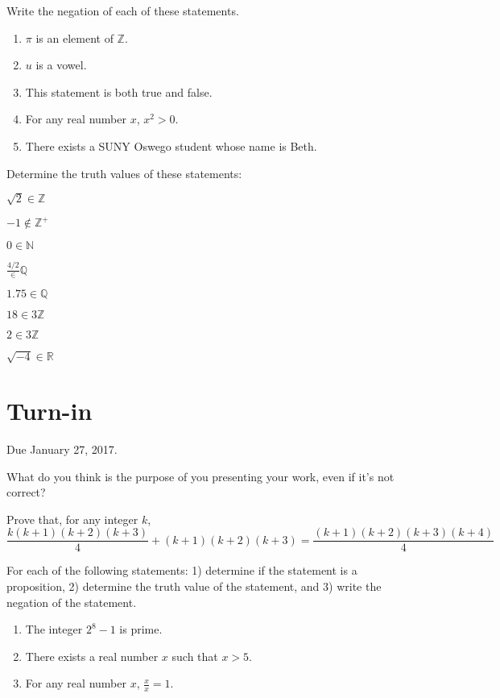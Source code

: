 \documentclass[12pt]{article}
\begin{document}
\begin{qu} Write the negation of each of these statements.
\begin{enumerate}[label=\alph*)]
\item $\pi$ is an element of $\mathbb{Z}$.
\item $u$ is a vowel.
\item This statement is both true and false.
\item For any real number $x$, $x^2>0$.
\item There exists a SUNY Oswego student whose name is Beth.
\end{enumerate}
\end{qu}

\begin{qu} Determine the truth values of these statements:

\begin{inparaenum}[a)]
\item $\sqrt{2} \in \mathbb{Z}$
\tab\item  $-1 \notin \mathbb{Z}^+$
\tab\item $0 \in \mathbb{N}$
\tab\item  $\frac{4/2} \in \mathbb{Q}$
\tab\item $1.75 \in \mathbb{Q}$
\tab\item  $18 \in 3\mathbb{Z}$
\tab \item $2 \in 3\mathbb{Z}$
\tab \item $\sqrt{-4} \in \mathbb{R}$
\end{inparaenum}
\end{qu}

\section{Turn-in} 

Due January 27, 2017.


\begin{qu} What do you think is the purpose of you presenting your work, even if it's not correct? \end{qu}


\begin{qu} Prove that, for any integer $k$, 
$$ \frac{k(k+1)(k+2)(k+3)}{4} + (k+1)(k+2)(k+3) =\frac{(k+1)(k+2)(k+3)(k+4)}{4}$$
 \end{qu}


\begin{qu} For each of the following statements: 1) determine if the statement is a proposition, 2) determine the truth value of the statement, and 3) write the negation of the statement.
\begin{enumerate}[label=\alph*)]
    \item The integer $2^8-1$ is prime.
    \item There exists a real number $x$ such that $x>5$.
    \item For any real number $x$, $\frac{x}{x}=1$.
\end{enumerate}

\end{qu}
\end{document}

